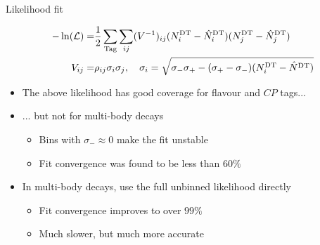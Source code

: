 \documentclass{beamer}
\begin{document}
\begin{frame}{Likelihood fit}
  \vspace{-0.5cm}
  \begin{center}
    \begin{align*}
      -\ln(\mathcal{L}) =& \frac{1}{2}\sum_{\rm Tag}\sum_{ij}(V^{-1})_{ij}(N^{\rm DT}_i - \hat{N}^{\rm DT}_i)(N^{\rm DT}_j - \hat{N}^{\rm DT}_j) \\
      V_{ij} =& \rho_{ij}\sigma_i\sigma_j, \quad \sigma_i = \sqrt{\sigma_-\sigma_+ - (\sigma_+ - \sigma_-)(N^{\rm DT}_i - \hat{N}^{\rm DT})}
    \end{align*}
  \end{center}
  \begin{itemize}
    \setlength\itemsep{1.0em}
    \item{The above likelihood has good coverage for flavour and $C\!P$ tags...}
    \item{... but not for multi-body decays}
    \begin{itemize}
      \item{Bins with $\sigma_-\approx0$ make the fit unstable}
      \item{Fit convergence was found to be less than $60\%$}
    \end{itemize}
    \item{In multi-body decays, use the full unbinned likelihood directly}
    \begin{itemize}
      \item{Fit convergence improves to over $99\%$}
      \item{Much slower, but much more accurate}
    \end{itemize}
  \end{itemize}
\end{frame}
\end{document}

